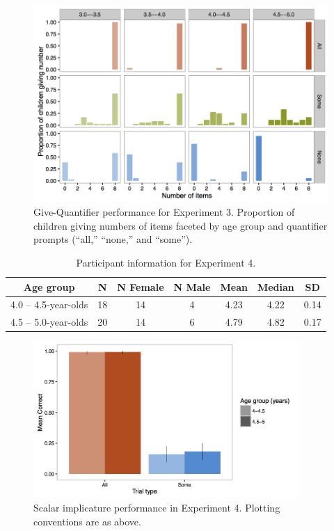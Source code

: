 \documentclass[man]{apa2}
\begin{document}
\begin{figure}
 \begin{center}
  \includegraphics[width=4.5in]{figures/exp3_GQhist.png}
  \caption{\label{fig:GQ_spread} Give-Quantifier performance for Experiment 3. Proportion of children giving numbers of items faceted by age group and quantifier prompts (``all,'' ``none,'' and ``some'').}
 \end{center}
\end{figure}

\begin{table}
\centering
\begin{tabular}{ccccccc}
\hline
{\bf Age group} & {\bf N} & {\bf N Female} & {\bf N Male} & {\bf Mean} & {\bf Median} & {\bf SD} \\
\hline
4.0 -- 4.5-year-olds & 18 & 14 & 4 & 4.23 & 4.22 & 0.14\\
4.5 -- 5.0-year-olds & 20 & 14 & 6 & 4.79 & 4.82 & 0.17\\
\hline
\end{tabular}
\caption{\label{tab:exp_4_demo} Participant information for Experiment 4.}
\end{table}

\begin{figure}
 \begin{center}
  \includegraphics[width=4in]{figures/exp4_SIperf.png}
  \caption{\label{fig:exp4_si} Scalar implicature performance in Experiment 4. Plotting conventions are as above.}
 \end{center}
\end{figure}


%
%
\end{document}
